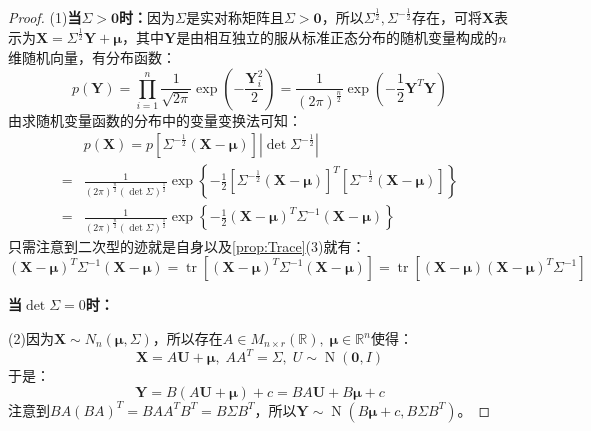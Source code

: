 \begin{proof}
	(1)\textbf{当$\Sigma>\mathbf{0}$时：}因为$\Sigma$是实对称矩阵且$\Sigma>\mathbf{0}$，所以$\Sigma^{\frac{1}{2}},\Sigma^{-\frac{1}{2}}$存在，可将$\mathbf{X}$表示为$\mathbf{X}=\Sigma^{\frac{1}{2}}\mathbf{Y}+\boldsymbol{\mu}$，其中$\mathbf{Y}$是由相互独立的服从标准正态分布的随机变量构成的$n$维随机向量，有分布函数：
	\begin{equation*}
		p(\mathbf{Y})=\prod_{i=1}^{n}\frac{1}{\sqrt{2\pi}}\exp\left(-\frac{\mathbf{Y}_i^2}{2}\right)=\frac{1}{(2\pi)^{\frac{n}{2}}}\exp\left(-\frac{1}{2}\mathbf{Y}^T\mathbf{Y}\right)
	\end{equation*}
	由求随机变量函数的分布中的变量变换法可知：
	\begin{align*}
		&p(\mathbf{X})=p[\Sigma^{-\frac{1}{2}}(\mathbf{X}-\boldsymbol{\mu})]|\det\Sigma^{-\frac{1}{2}}| \\
		=&\frac{1}{(2\pi)^{\frac{n}{2}}(\det\Sigma)^\frac{1}{2}}\exp\left\{-\frac{1}{2}[\Sigma^{-\frac{1}{2}}(\mathbf{X}-\boldsymbol{\mu})]^T[\Sigma^{-\frac{1}{2}}(\mathbf{X}-\boldsymbol{\mu})]\right\} \\
		=&\frac{1}{(2\pi)^{\frac{n}{2}}(\det\Sigma)^{\frac{1}{2}}}\exp\left\{-\frac{1}{2}(\mathbf{X}-\boldsymbol{\mu})^T\Sigma^{-1}(\mathbf{X}-\boldsymbol{\mu})\right\}
	\end{align*}
	只需注意到二次型的迹就是自身以及\cref{prop:Trace}(3)就有：
	\begin{equation*}
		(\mathbf{X}-\boldsymbol{\mu})^T\Sigma^{-1}(\mathbf{X}-\boldsymbol{\mu})=\operatorname{tr}[(\mathbf{X}-\boldsymbol{\mu})^T\Sigma^{-1}(\mathbf{X}-\boldsymbol{\mu})]=\operatorname{tr}[(\mathbf{X}-\boldsymbol{\mu})(\mathbf{X}-\boldsymbol{\mu})^T\Sigma^{-1}]
	\end{equation*}\par
	\textbf{当$\det\Sigma=0$时：}\par
	(2)因为$\mathbf{X}\sim N_n(\boldsymbol{\mu},\Sigma)$，所以存在$A\in M_{n\times r}(\mathbb{R}),\;\boldsymbol{\mu}\in\mathbb{R}^{n}$使得：
	\begin{equation*}
		\mathbf{X}=A\mathbf{U}+\boldsymbol{\mu},\;AA^T=\Sigma,\;U\sim \operatorname{N}(\mathbf{0},I)
	\end{equation*}
	于是：
	\begin{equation*}
		\mathbf{Y}=B(A\mathbf{U}+\boldsymbol{\mu})+c=BA\mathbf{U}+B\boldsymbol{\mu}+c
	\end{equation*}
	注意到$BA(BA)^T=BAA^TB^T=B\Sigma B^T$，所以$\mathbf{Y}\sim \operatorname{N}(B\boldsymbol{\mu}+c,B\Sigma B^T)$。\par

\end{proof}
